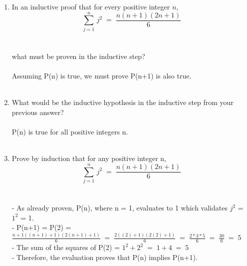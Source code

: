 \documentclass{amsart}
\theoremstyle{definition}
\theoremstyle{Exercise}
\theoremstyle{remark}
\theoremstyle{rule}
\numberwithin{equation}{section}
\begin{document}
\begin{enumerate}[label=(\alph*)]
    \item In an inductive proof that for every positive integer $n$,
   \[\displaystyle \sum_{j=1}^{n}\, j^2 \;=\;\frac{n(n+1)(2n+1)}{6}\]
   \\\\
   what must be proven in the inductive step?\\\\
   Assuming P(n) is true, we must prove P(n+1) is also true.
   \\\\
   \item What would be the inductive hypothesis in the inductive step from your previous answer?\\\\
    P(n) is true for all positive integers n.
    \\\\
   \item Prove by induction that for any positive integer n,
   \[\displaystyle \sum_{j=1}^{n}\, j^2 \;=\;\frac{n(n+1)(2n+1)}{6}\] \\\\
    - As already proven, P(n), where n = 1, evaluates to 1 which validates $j^2$ = $1^2$ = 1.\\
    - P(n+1) = P(2) = $\frac{n+1((n+1)+1)(2(n+1)+1)}{6}\;=\;\frac{2((2)+1)(2(2)+1)}{6}\;=\;\frac{2*3*5}{6}\;=\;\frac{30}{6}\;=\;5$\\
    - The sum of the squares of P(2) = $1^2 + 2^2\;=\;1 + 4\;=\;5$\\
    - Therefore, the evaluation proves that P(n) implies P(n+1).
    \\\\
\end{enumerate}
\end{document}
